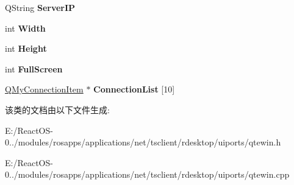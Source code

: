 \begin{DoxyCompactItemize}
Q\+String {\bfseries Server\+IP}
\item 
\mbox{\label{class_q_my_dialog_a04f86b5c49b5de8afa31d8234351b3d8}} 
int {\bfseries Width}
\item 
\mbox{\label{class_q_my_dialog_a1c433a16d8f9069d7360431e3fc330b2}} 
int {\bfseries Height}
\item 
\mbox{\label{class_q_my_dialog_a7640d1947ebfefb7a04a4290c64275a9}} 
int {\bfseries Full\+Screen}
\item 
\mbox{\label{class_q_my_dialog_ab8591385959fa0cf3a8bc7d1e2a24a9e}} 
\hyperlink{class_q_my_connection_item}{Q\+My\+Connection\+Item} $\ast$ {\bfseries Connection\+List} \mbox{[}10\mbox{]}
\end{DoxyCompactItemize}


该类的文档由以下文件生成\+:\begin{DoxyCompactItemize}
\item 
E\+:/\+React\+O\+S-\/0../modules/rosapps/applications/net/tsclient/rdesktop/uiports/qtewin.\+h\item 
E\+:/\+React\+O\+S-\/0../modules/rosapps/applications/net/tsclient/rdesktop/uiports/qtewin.\+cpp\end{DoxyCompactItemize}

